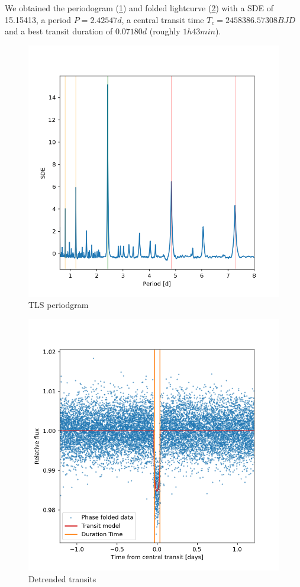 \documentclass[a4paper,11pt,twocolumn]{article}
\begin{document}
We obtained the periodogram (\ref{fig:TLS_periodogram}) and folded lightcurve (\ref{fig:detrended_transits}) 
with a SDE of 15.15413, a period  $P=2.42547 d$, a central transit time 
$T_c=2458386.57308 BJD$ and a best transit duration of $0.07180 d$ (roughly $1h43min$).
 


\begin{figure}
   \centering
    \includegraphics[scale=0.3, angle=0]{../pictures/tess/sde.png}
    \caption{TLS periodgram}
    \label{fig:TLS_periodogram}
\end{figure}

\begin{figure}
  \centering
    \includegraphics[scale=0.3, angle=0]{../pictures/tess/transit.png}
    \caption{Detrended transits}
    \label{fig:detrended_transits}
\end{figure}
\end{document}
